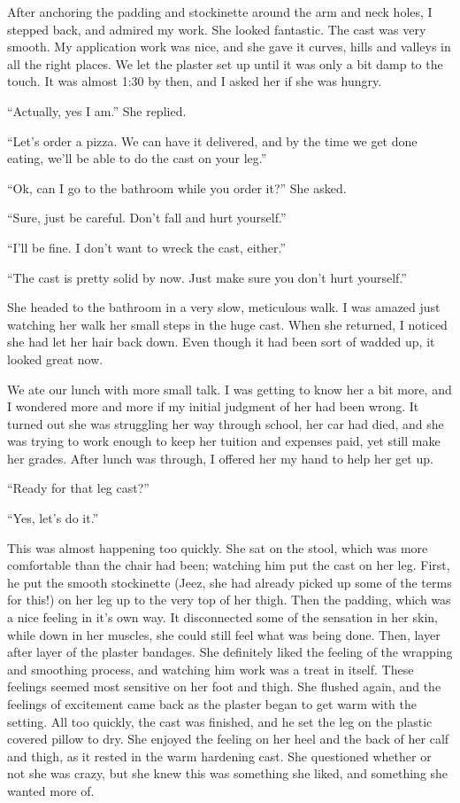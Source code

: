 After anchoring the padding and stockinette around the arm and neck holes, I stepped back,
and admired my work. She looked fantastic. The cast was very smooth. My application work was
nice, and she gave it curves, hills and valleys in all the right places. We let the plaster set
up until it was only a bit damp to the touch. It was almost 1:30 by then, and I asked her if she
was hungry.

``Actually, yes I am.'' She replied.

``Let's order a pizza. We can have it delivered, and by the time we get done eating, we'll be
able to do the cast on your leg.''

``Ok, can I go to the bathroom while you order it?'' She asked.

``Sure, just be careful. Don't fall and hurt yourself.''

``I'll be fine. I don't want to wreck the cast, either.''

``The cast is pretty solid by now. Just make sure you don't hurt yourself.''

She headed to the bathroom in a very slow, meticulous walk. I was amazed just watching her
walk her small steps in the huge cast. When she returned, I noticed she had let her hair back
down. Even though it had been sort of wadded up, it looked great now.

We ate our lunch with more small talk. I was getting to know her a bit more, and I wondered
more and more if my initial judgment of her had been wrong. It turned out she was struggling her
way through school, her car had died, and she was trying to work enough to keep her tuition and
expenses paid, yet still make her grades. After lunch was through, I offered her my hand to help
her get up.

``Ready for that leg cast?''

``Yes, let's do it.''

\begin{thought}
This was almost happening too quickly. She sat on the stool, which was more comfortable than
the chair had been; watching him put the cast on her leg. First, he put the smooth stockinette
(Jeez, she had already picked up some of the terms for this!) on her leg up to the very top of
her thigh. Then the padding, which was a nice feeling in it's own way. It disconnected some of
the sensation in her skin, while down in her muscles, she could still feel what was being done.
Then, layer after layer of the plaster bandages. She definitely liked the feeling of the
wrapping and smoothing process, and watching him work was a treat in itself. These feelings
seemed most sensitive on her foot and thigh. She flushed again, and the feelings of excitement
came back as the plaster began to get warm with the setting. All too quickly, the cast was
finished, and he set the leg on the plastic covered pillow to dry. She enjoyed the feeling on
her heel and the back of her calf and thigh, as it rested in the warm hardening cast. She
questioned whether or not she was crazy, but she knew this was something she liked, and
something she wanted more of.
\end{thought}


